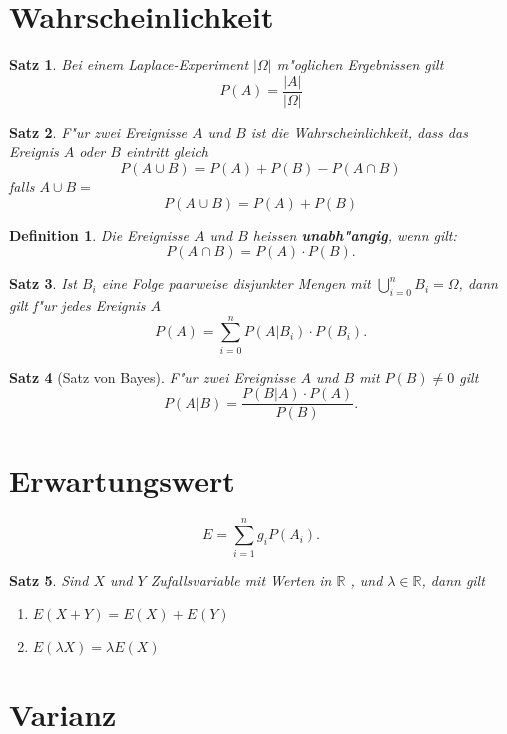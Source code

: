 \documentclass[ngerman, a4paper, 10pt, twocolumn, DIV20, headings=small]{scrartcl}
\newtheorem{definition}{Definition}
\newtheorem{satz}{Satz}
\begin{document}
\section{Wahrscheinlichkeit}
\label{sec:wahrscheinlichkeit}

\begin{satz}
  Bei einem Laplace-Experiment $| \Omega |$ m"oglichen Ergebnissen gilt
\[
P(A) = \frac{|A|}{|\Omega|}
\]
\end{satz}

\begin{satz}
F"ur zwei Ereignisse $A$ und $B$ ist die Wahrscheinlichkeit, dass das Ereignis $A$ oder $B$ eintritt gleich
\[
P(A\cup B) = P(A) + P(B) - P(A\cap B)
\]
falls $ A \cup B = {} $
\[
P(A\cup B) = P(A) + P(B)
\]
\end{satz}

\begin{definition}
Die Ereignisse $A$ und $B$ heissen {\bf unabh"angig}, wenn gilt:
\[
P(A\cap B) = P(A)\cdot P(B).
\]
\end{definition}

\begin{satz}
Ist $B_i$ eine Folge paarweise disjunkter Mengen mit $\bigcup_{i=0}^{n}B_i=\Omega$, dann gilt f"ur jedes Ereignis $A$
\[
P(A)=\sum_{i=0}^{n}P(A|B_i)\cdot P(B_i).
\]
\end{satz}

\begin{satz}[Satz von Bayes]
F"ur zwei Ereignisse $A$ und $B$ mit $P(B)\ne0$ gilt
\[
P(A|B)=\frac{P(B|A)\cdot P(A)}{P(B)}.
\]
\end{satz}

\section{Erwartungswert}
\label{sec:erwartungswert}

\[
E=\sum_{i=1}^{n}g_iP(A_i).
\]

\begin{satz}
\label{rechenregeln-erwartungswert}
Sind $X$ und $Y$ Zufallsvariable mit Werten in $\mathbb{R}$ ,
und $\lambda\in\mathbb{R}$, dann gilt
\begin{enumerate}
\item $E(X+Y)=E(X)+E(Y)$
\item $E(\lambda X)=\lambda E(X)$

\end{enumerate}
\end{satz}

\section{Varianz}
\label{sec:varianz}
\end{document}
